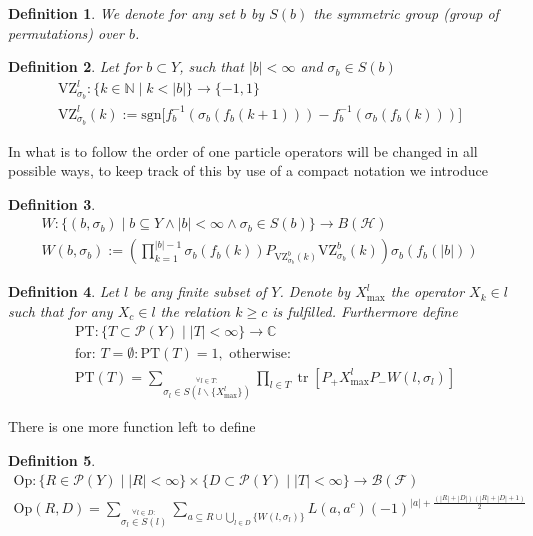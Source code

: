 \documentclass[b5paper,draft,openbib,12pt]{memoir}
\newtheorem{Def}{Definition}[section]
\DeclareMathOperator{\tr}{tr}
\begin{document}
\begin{Def}
We denote for any set \(b\) by \(S(b)\) the symmetric group (group of permutations) over \(b\).
\end{Def}

\begin{Def}
Let for  \(b\subset Y\), such that \(|b|<\infty\) and \(\sigma_b \in S(b)\)
\begin{align*}
\text{VZ}^l_{\sigma_b}: \{k\in\mathbb{N}\mid k<|b|\} \rightarrow \{-1,1\}\\
\text{VZ}^l_{\sigma_b}(k):=\text{sgn}\big[f_b^{-1}(\sigma_b(f_b(k+1))) - f_b^{-1}(\sigma_b(f_b(k)))  \big]
\end{align*}
\end{Def}

In what is to follow the order of one particle operators will be changed in all possible ways, to keep track of this by
use of a compact notation we introduce
\begin{Def}
\begin{align*}
W: \{(b,\sigma_b) \mid b\subseteq Y \wedge |b|<\infty \wedge \sigma_b \in S(b) \} \rightarrow B(\mathcal{H})\\
W(b,\sigma_b):= \left( \prod_{k=1}^{|b|-1} \sigma_{b}(f_b(k)) P_{\text{VZ}_{\sigma_b}^b(k)} \text{VZ}_{\sigma_b}^b(k) \right) \sigma_b (f_b(|b|))
\end{align*}
\end{Def}

\begin{Def} Let \(l\) be any finite subset of \(Y\). Denote by \(X^l_{\text{max}}\) the operator \(X_k\in l \)
such that for any \(X_c\in l \) the relation \(k\ge c\) is fulfilled. Furthermore define
\begin{align*}
&\text{PT}: \{T\subset \mathcal{P}(Y)\mid |T|<\infty\}\rightarrow \mathbb{C}\\
&\text{for: } T=\emptyset: \text{PT}(T)=1, \text{ otherwise: }\\
&\text{PT}(T)=\sum_{\stackrel{\forall l \in T:}{\sigma_l \in S(l \backslash \{X_{\text{max}}^l\})}} \prod_{l\in T} 
\tr [P_+ X^l_{\text{max}} P_- W(l, \sigma_l)]
\end{align*}
\end{Def}

There is one more function left to define
\begin{Def}
\begin{align*}
\text{Op}:  \{R\in \mathcal{P}(Y)\mid |R|<\infty\} \times \{D\subset \mathcal{P}(Y)\mid |T|<\infty\}\rightarrow \mathcal{B}(\mathcal{F})\\
\text{Op}(R,D)=\sum_{\stackrel{\forall l \in D:}{\sigma_l \in S(l)}} \sum_{a \subseteq R \cup \bigcup_{l\in D} \{W(l,\sigma_l)\}} L(a,a^c)(-1)^{|a|+  \frac{(|R| + |D|)(|R|+|D|+1)}{2}}
\end{align*}
\end{Def}
\end{document}
